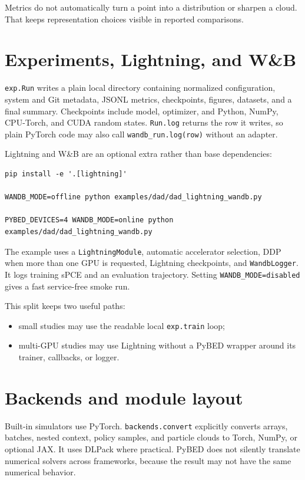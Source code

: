 \documentclass[11pt]{article}
\begin{document}
Metrics do not automatically turn a point into a distribution or sharpen a cloud.
That keeps representation choices visible in reported comparisons.

\section{Experiments, Lightning, and W\&B}

\texttt{exp.Run} writes a plain local directory containing normalized
configuration, system and Git metadata, JSONL metrics, checkpoints, figures,
datasets, and a final summary. Checkpoints include model, optimizer, and Python,
NumPy, CPU-Torch, and CUDA random states. \texttt{Run.log} returns the row it
writes, so plain PyTorch code may also call
\texttt{wandb\_run.log(row)} without an adapter.

Lightning and W\&B are an optional extra rather than base dependencies:
\begin{lstlisting}
pip install -e '.[lightning]'

WANDB_MODE=offline python examples/dad/dad_lightning_wandb.py

PYBED_DEVICES=4 WANDB_MODE=online python examples/dad/dad_lightning_wandb.py
\end{lstlisting}
The example uses a \texttt{LightningModule}, automatic accelerator selection,
DDP when more than one GPU is requested, Lightning checkpoints, and
\texttt{WandbLogger}. It logs training sPCE and an evaluation trajectory. Setting
\texttt{WANDB\_MODE=disabled} gives a fast service-free smoke run.

This split keeps two useful paths:
\begin{itemize}
  \item small studies may use the readable local \texttt{exp.train} loop;
  \item multi-GPU studies may use Lightning without a PyBED wrapper around its
  trainer, callbacks, or logger.
\end{itemize}

\section{Backends and module layout}

Built-in simulators use PyTorch. \texttt{backends.convert} explicitly converts
arrays, batches, nested context, policy samples, and particle clouds to Torch,
NumPy, or optional JAX. It uses DLPack where practical. PyBED does not silently
translate numerical solvers across frameworks, because the result may not have the
same numerical behavior.
\end{document}
